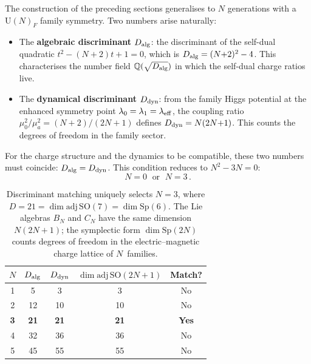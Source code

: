 \documentclass[12pt,a4paper]{article}
\newcommand{\UU}{\mathrm{U}}
\newcommand{\SO}{\mathrm{SO}}
\newcommand{\adj}{\mathrm{adj}}
\newcommand{\Sp}{\mathrm{Sp}}
\begin{document}
The construction of the preceding sections generalises to $N$
generations with a $\UU(N)_F$ family symmetry. Two numbers arise
naturally:
\begin{itemize}
  \item The \textbf{algebraic discriminant} $D_{\rm alg}$: the
    discriminant of the self-dual quadratic $t^2 - (N{+}2)t + 1 = 0$,
    which is $D_{\rm alg} = (N{+}2)^2 - 4$. This characterises the
    number field $\mathbb{Q}(\sqrt{D_{\rm alg}})$ in which the
    self-dual charge ratios live.
  \item The \textbf{dynamical discriminant} $D_{\rm dyn}$: from the
    family Higgs potential at the
    enhanced symmetry point $\lambda_0 = \lambda_1 = \lambda_{\rm eff}$,
    the coupling ratio $\mu_0^2/\mu_a^2 = (N{+}2)/(2N{+}1)$ defines
    $D_{\rm dyn} = N(2N{+}1)$. This counts the degrees of freedom in
    the family sector.
\end{itemize}
For the charge structure and the dynamics to be compatible, these
two numbers must coincide: $D_{\rm alg} = D_{\rm dyn}$.
This condition reduces to $N^2 - 3N = 0$:
\begin{equation}
  \boxed{N = 0 \;\text{ or }\; N = 3\,.}
  \label{eq:N3}
\end{equation}

\begin{table}[ht]
\centering
\begin{tabular}{ccccc}
\toprule
$N$ & $D_{\rm alg}$ & $D_{\rm dyn}$ & $\dim\adj\,\SO(2N{+}1)$ & Match? \\
\midrule
1 & 5  & 3  & 3  & No \\
2 & 12 & 10 & 10 & No \\
\textbf{3} & \textbf{21} & \textbf{21} & \textbf{21} & \textbf{Yes} \\
4 & 32 & 36 & 36 & No \\
5 & 45 & 55 & 55 & No \\
\bottomrule
\end{tabular}
\caption{Discriminant matching uniquely selects $N=3$, where
$D = 21 = \dim\adj\,\SO(7) = \dim\Sp(6)$. The Lie algebras $B_N$ and $C_N$
have the same dimension $N(2N{+}1)$; the symplectic form
$\dim\Sp(2N)$ counts degrees of freedom in the electric--magnetic
charge lattice of $N$~families.}
\label{tab:N3}
\end{table}
\end{document}
